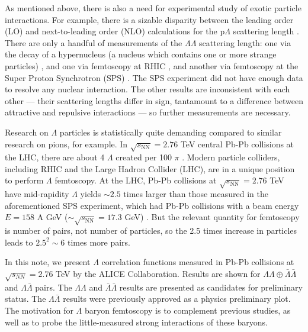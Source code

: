 As mentioned above, there is also a need for experimental study of exotic particle interactions.
For example, there is a sizable disparity between the leading order (LO) and next-to-leading order (NLO) calculations for the p$\Lambda$ scattering length \cite{...,...}.
There are only a handful of measurements of the $\Lambda\Lambda$ scattering length: one via the decay of a hypernucleus (a nucleus which contains one or more strange particles) \cite{Takahashi:2001nm,Filikhin:2002wm,Hiyama:2002yj}, and one via femtoscopy at RHIC \cite{Adamczyk:2014vca}, and another via femtoscopy at the Super Proton Synchrotron (SPS) \cite{Andersen:1999gq}.
The SPS experiment did not have enough data to resolve any nuclear interaction.
The other results are inconsistent with each other --- their scattering lengths differ in sign, tantamount to a difference between attractive and repulsive interactions --- so further measurements are necessary.

Research on $\Lambda$ particles is statistically quite demanding compared to similar research on pions, for example.
In $\sqrt{s_{\mathrm{NN}}}=2.76$ TeV central Pb-Pb collisions at the LHC, there are about 4 $\Lambda$ created per 100 $\pi$ \cite{Zhang:2013fta}.
Modern particle colliders, including RHIC and the Large Hadron Collider (LHC), are in a unique position to perform $\Lambda$ femtoscopy.
At the LHC, Pb-Pb collisions at $\sqrt{s_{\mathrm{NN}}}=2.76$ TeV have mid-rapidity $\Lambda$ yields $\sim 2.5$ times larger than those measured in the aforementioned SPS experiment, which had Pb-Pb collisions with a beam energy $E = 158$ A GeV ($\sim \sqrt{s_{\mathrm{NN}}}=17.3$ GeV)  \cite{Abelev:2013xaa,Alt:2008qm}.
But the relevant quantity for femtoscopy is number of pairs, not number of particles, so the 2.5 times increase in particles leads to $2.5^2 \sim 6$ times more pairs. 








In this note, we present $\Lambda$ correlation functions measured in Pb-Pb collisions at $\sqrt{s_{NN}}=2.76$ TeV by the ALICE Collaboration.  
Results are shown for $\Lambda\Lambda\oplus\bar{\Lambda}\bar{\Lambda}$ and $\Lambda\bar{\Lambda}$ pairs. 
The $\Lambda\Lambda$ and $\bar{\Lambda}\bar{\Lambda}$ results are presented as candidates for preliminary status. 
The $\Lambda\bar{\Lambda}$ results were previously approved as a physics preliminary plot.  
The motivation for $\Lambda$ baryon femtoscopy is to complement previous studies, as well as to probe the little-measured strong interactions of these baryons.

